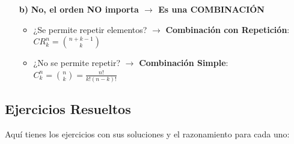 \documentclass[12pt, letterpaper]{article}
\begin{document}
\begin{enumerate}[label=\bfseries, wide]
\begin{itemize}
		      \item[\bfseries b)] \textbf{No, el orden NO importa $\rightarrow$ Es una COMBINACIÓN}
		            \begin{itemize}
			            \item ¿Se permite repetir elementos? $\rightarrow$ \textbf{Combinación con Repetición}: $CR_k^n = \binom{n+k-1}{k}$
			            \item ¿No se permite repetir? $\rightarrow$ \textbf{Combinación Simple}: $C_k^n = \binom{n}{k} = \frac{n!}{k!(n-k)!}$
		            \end{itemize}
	      \end{itemize}
\end{enumerate}\subsection*{Ejercicios Resueltos}
Aquí tienes los ejercicios con sus soluciones y el razonamiento para cada uno:
\end{document}
